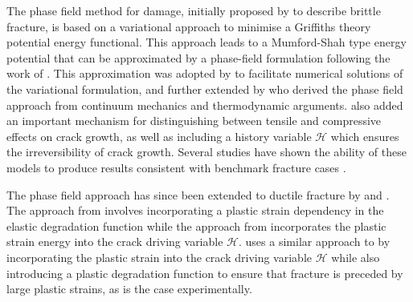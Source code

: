 \documentclass[sn-mathphys,Numbered,draft]{sn-jnl}%
\begin{document}
The phase field method for damage, initially proposed by \citet{francfort_revisiting_1998} to describe brittle fracture, is based on a variational approach to minimise a Griffiths theory potential energy functional. %
This approach leads to a Mumford-Shah \cite{mumford_optimal_1989} type energy potential that can be approximated by a phase-field formulation following the work of \citet{ambrosio_approximation_1990}.
This approximation was adopted by \citet{bourdin_time-discrete_2011} to facilitate numerical solutions of the variational formulation, and further extended by \citet{miehe_phase_2010} who derived the phase field approach from continuum mechanics and thermodynamic arguments.
\citet{miehe_phase_2010} also added an important mechanism for distinguishing between tensile and compressive effects on crack growth, as well as including a history variable $\mathcal{H}$ which ensures the irreversibility of crack growth.
Several studies have shown the ability of these models to produce results consistent with benchmark fracture cases \cite{borden_phase-field_2012,miehe_phase_2010}.

The phase field approach has since been extended to ductile fracture by \citet{ambati_phase-field_2015, borden_phase-field_2016} and \citet{miehe_phase_2016}.
The approach from \citet{ambati_phase-field_2015} involves incorporating a plastic strain dependency in the elastic degradation function while the approach from \citet{miehe_phase_2016} incorporates the plastic strain energy into the crack driving variable $\mathcal{H}$.
\citet{borden_phase-field_2016} uses a similar approach to \citet{miehe_phase_2016} by incorporating the plastic strain into the crack driving variable $\mathcal{H}$ while also introducing a plastic degradation function to ensure that fracture is preceded by large plastic strains, as is the case experimentally.
\end{document}
